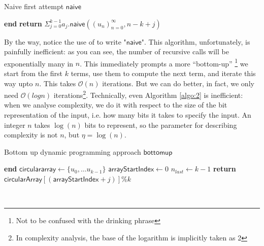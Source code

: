 \documentclass{article}
\newcommand{\bigO}{\mathcal{O}}
\newcommand{\leavespace}{\medskip \newline}
\begin{document}
\begin{algorithm}[ht]
\caption{Naive first attempt $\mathsf{naive}$}
\SetAlgoLined
\DontPrintSemicolon
{}
\textbf{end} \;
\textbf{return} $\Sigma_{j=0}^{k-1}a_j.\mathsf{naive}((u_n)_{n=0}^\infty,n-k+j)$ \;
\end{algorithm}

By the way, notice the use of  to write "$\mathsf{naive}$". This algorithm, unfortunately, is painfully inefficient: as you can see, the number of recursive calls will be exponentially many in $n$. This immediately prompts a more “bottom-up” \footnote{Not to be confused with the drinking phrase}
 we start from the first $k$ terms, use them to compute the next term, and iterate this way upto $n$. This takes $\bigO(n)$ iterations.
\leavespace
But we can do better, in fact, we only need $\bigO(log n)$ iterations\footnote{
In complexity analysis, the base of the logarithm is implicitly taken as 2}.
\leavespace
Technically, even Algorithm \ref{algo:2} is inefficient: when we analyse complexity, we do it with respect to the size of the bit representation of the input, i.e. how many bits it takes to specify the input. An integer $n$ takes $\log{}(n)$ bits to represent, so the parameter for describing complexity is not $n$, but $\eta = \log{}(n)$.
\vfill
\begin{algorithm}[!ht]
\caption{Bottom up dynamic programming approach $\mathsf{bottomup}$}\label{algo:2}
\SetAlgoLined
\DontPrintSemicolon
{}
\textbf{end} \;
$\mathsf{circular array} \gets \{ u_0, \dots u_{k-1} \} $\;
$\mathsf{arrayStartIndex} \gets 0$ \;
$n_{last} \gets k-1$ \;
\textbf{return} $\mathsf{circularArray}[(\mathsf{arrayStartIndex} + j)]\%k$
\end{algorithm}
\vspace{1em}
\\
\end{document}
